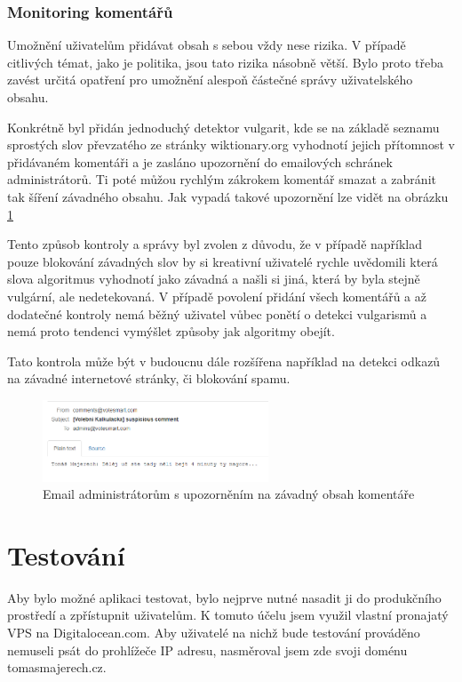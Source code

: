 \subsection{Monitoring komentářů}
Umožnění uživatelům přidávat obsah s sebou vždy nese rizika. V případě citlivých témat, jako je politika, jsou tato rizika násobně větší. Bylo proto třeba zavést určitá opatření pro umožnění alespoň částečné správy uživatelského obsahu. 
\par Konkrétně byl přidán jednoduchý detektor vulgarit, kde se na základě seznamu sprostých slov převzatého ze stránky wiktionary.org\cite{wiktionary-vulgarity} vyhodnotí jejich přítomnost v přidávaném komentáři a je zasláno upozornění do emailových schránek administrátorů. Ti poté můžou rychlým zákrokem komentář smazat a zabránit tak šíření závadného obsahu. Jak vypadá takové upozornění lze vidět na obrázku \ref{fig:aplikace-komentar}
\par Tento způsob kontroly a správy byl zvolen z důvodu, že v případě například pouze blokování závadných slov by si kreativní uživatelé rychle uvědomili která slova algoritmus vyhodnotí jako závadná a našli si jiná, která by byla stejně vulgární, ale nedetekovaná. V případě povolení přidání všech komentářů a až dodatečné kontroly nemá běžný uživatel vůbec ponětí o detekci vulgarismů a nemá proto tendenci vymýšlet způsoby jak algoritmy obejít.

\par Tato kontrola může být v budoucnu dále rozšířena například na detekci odkazů na závadné internetové stránky, či blokování spamu.

\begin{figure}
    \centering
    \includegraphics[width=0.6\textwidth]{obrazky-figures/aplikace-komentar.png}
    \caption{Email administrátorům s upozorněním na závadný obsah komentáře}
    \label{fig:aplikace-komentar}
\end{figure}


\chapter{Testování}
\label{chap:testovani}
Aby bylo možné aplikaci testovat, bylo nejprve nutné nasadit ji do produkčního prostředí a zpřístupnit uživatelům. K tomuto účelu jsem využil vlastní pronajatý VPS na Digitalocean.com. Aby uživatelé na nichž bude testování prováděno nemuseli psát do prohlížeče IP adresu, nasměroval jsem zde svoji doménu tomasmajerech.cz. 

